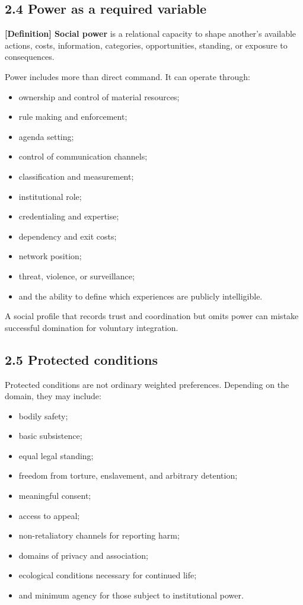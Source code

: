 \documentclass[
  11pt,
]{article}
\providecommand{\tightlist}{%
  \setlength{\itemsep}{0pt}\setlength{\parskip}{0pt}}
\begin{document}
\subsection{2.4 Power as a required
variable}\label{power-as-a-required-variable}

\textbf{{[}Definition{]} Social power} is a relational capacity to shape
another's available actions, costs, information, categories,
opportunities, standing, or exposure to consequences.

Power includes more than direct command. It can operate through:

\begin{itemize}
\tightlist
\item
  ownership and control of material resources;
\item
  rule making and enforcement;
\item
  agenda setting;
\item
  control of communication channels;
\item
  classification and measurement;
\item
  institutional role;
\item
  credentialing and expertise;
\item
  dependency and exit costs;
\item
  network position;
\item
  threat, violence, or surveillance;
\item
  and the ability to define which experiences are publicly intelligible.
\end{itemize}

A social profile that records trust and coordination but omits power can
mistake successful domination for voluntary integration.

\subsection{2.5 Protected conditions}\label{protected-conditions}

Protected conditions are not ordinary weighted preferences. Depending on
the domain, they may include:

\begin{itemize}
\tightlist
\item
  bodily safety;
\item
  basic subsistence;
\item
  equal legal standing;
\item
  freedom from torture, enslavement, and arbitrary detention;
\item
  meaningful consent;
\item
  access to appeal;
\item
  non-retaliatory channels for reporting harm;
\item
  domains of privacy and association;
\item
  ecological conditions necessary for continued life;
\item
  and minimum agency for those subject to institutional power.
\end{itemize}
\end{document}
